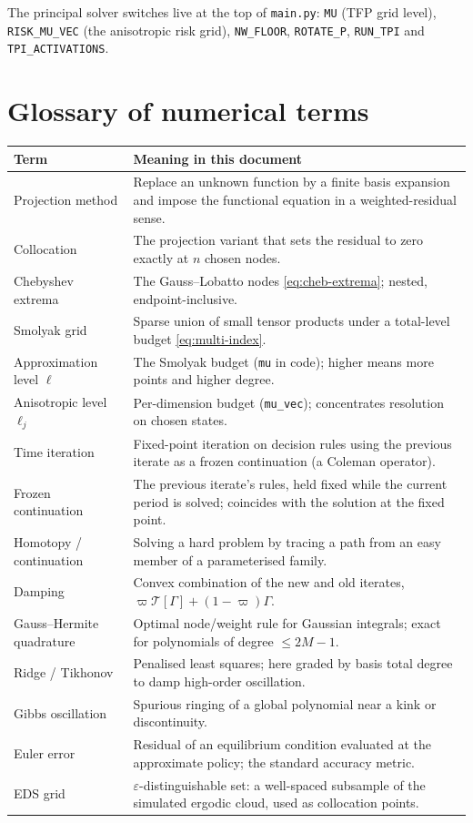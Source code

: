 \documentclass[11pt]{article}
\numberwithin{equation}{section}
\newcommand{\code}[1]{\texttt{\small #1}}
\theoremstyle{definition}
\theoremstyle{plain}
\theoremstyle{remark}
\begin{document}
The principal solver switches live at the top of \code{main.py}: \code{MU} (TFP grid
level), \code{RISK\_MU\_VEC} (the anisotropic risk grid), \code{NW\_FLOOR},
\code{ROTATE\_P}, \code{RUN\_TPI} and \code{TPI\_ACTIVATIONS}.

\section{Glossary of numerical terms}

\begin{center}\small
\begin{tabular}{@{}lp{9.6cm}@{}}
\toprule
Term & Meaning in this document \\
\midrule
Projection method & Replace an unknown function by a finite basis expansion and
impose the functional equation in a weighted-residual sense. \\
Collocation & The projection variant that sets the residual to zero exactly at $n$
chosen nodes. \\
Chebyshev extrema & The Gauss--Lobatto nodes \eqref{eq:cheb-extrema}; nested, endpoint-inclusive. \\
Smolyak grid & Sparse union of small tensor products under a total-level budget
\eqref{eq:multi-index}. \\
Approximation level $\ell$ & The Smolyak budget (\code{mu} in code); higher means more
points and higher degree. \\
Anisotropic level $\ell_j$ & Per-dimension budget (\code{mu\_vec}); concentrates
resolution on chosen states. \\
Time iteration & Fixed-point iteration on decision rules using the previous iterate as
a frozen continuation (a Coleman operator). \\
Frozen continuation & The previous iterate's rules, held fixed while the current
period is solved; coincides with the solution at the fixed point. \\
Homotopy / continuation & Solving a hard problem by tracing a path from an easy member
of a parameterised family. \\
Damping & Convex combination of the new and old iterates,
$\varpi\mathcal{T}[\Gamma]+(1-\varpi)\Gamma$. \\
Gauss--Hermite quadrature & Optimal node/weight rule for Gaussian integrals; exact for
polynomials of degree $\le2M-1$. \\
Ridge / Tikhonov & Penalised least squares; here graded by basis total degree to damp
high-order oscillation. \\
Gibbs oscillation & Spurious ringing of a global polynomial near a kink or
discontinuity. \\
Euler error & Residual of an equilibrium condition evaluated at the approximate policy;
the standard accuracy metric. \\
EDS grid & $\varepsilon$-distinguishable set: a well-spaced subsample of the simulated
ergodic cloud, used as collocation points. \\
\bottomrule
\end{tabular}
\end{center}
\end{document}
